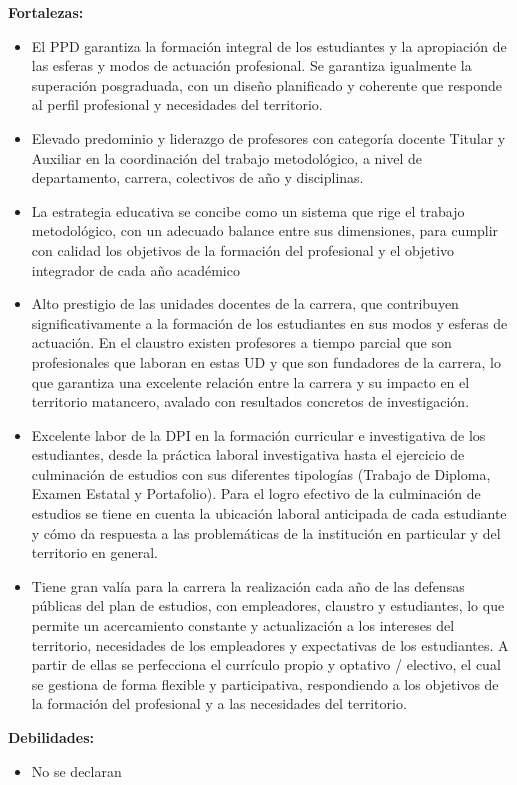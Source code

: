 \textbf{Fortalezas:}
\begin{itemize}
	\setlength\itemsep{-0.5em}
	\item El PPD garantiza la formación integral de los estudiantes y la apropiación de las esferas y modos de actuación profesional. Se garantiza igualmente la superación posgraduada, con un diseño planificado y coherente que responde al perfil profesional y necesidades del territorio.  
	\item Elevado predominio y liderazgo de profesores con categoría docente Titular y Auxiliar en la coordinación del trabajo metodológico, a nivel de departamento, carrera, colectivos de año y disciplinas.
	\item La estrategia educativa se concibe como un sistema que rige el trabajo metodológico, con un adecuado balance entre sus dimensiones, para cumplir con calidad los objetivos de la formación del profesional y el objetivo integrador de cada año académico
	\item Alto prestigio de las unidades docentes de la carrera, que contribuyen significativamente a la formación de los estudiantes en sus modos y esferas de actuación. En el claustro existen profesores a tiempo parcial que son profesionales que laboran en estas UD y que son fundadores de la carrera, lo que garantiza una excelente relación entre la carrera y su impacto en el territorio matancero, avalado con resultados concretos de investigación. 
	\item Excelente labor de la DPI en la formación curricular e investigativa de los estudiantes, desde la práctica laboral investigativa hasta el ejercicio de culminación de estudios con sus diferentes tipologías (Trabajo de Diploma, Examen Estatal y Portafolio). Para el logro efectivo de la culminación de estudios se tiene en cuenta la ubicación laboral anticipada de cada estudiante y cómo da respuesta a las problemáticas de la institución en particular y del territorio en general.
	
	\item Tiene gran valía para la carrera la realización cada año de las defensas públicas del plan de estudios, con empleadores, claustro y estudiantes, lo que permite un acercamiento constante y actualización a los intereses del territorio, necesidades de los empleadores y expectativas de los estudiantes. A partir de ellas se perfecciona el currículo propio y optativo / electivo, el cual se gestiona de forma flexible y participativa, respondiendo a los objetivos de la formación del profesional y a las necesidades del territorio.
\end{itemize}


\textbf{Debilidades:}
\begin{itemize}
	\setlength\itemsep{-0.5em}
	\item No se declaran 
\end{itemize}